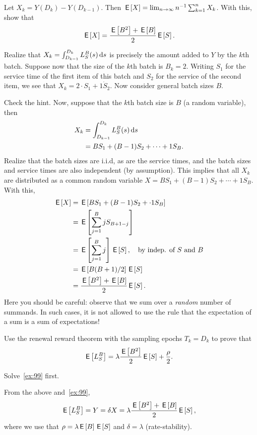 \begin{extra}\label{ex:99}
Let $X_k = Y(D_k)-Y(D_{k-1})$. Then $\,\mathsf{E}\left[X\right] = \lim_{n\to\infty} n^{-1} \sum_{k=1}^n X_k$. With this, show that
\begin{equation*}
  \,\mathsf{E}\left[X\right] = \frac{\,\mathsf{E}\left[B^2\right]+\,\mathsf{E}\left[B\right]}2 \,\mathsf{E}\left[S\right].
\end{equation*}
\begin{hint}
  Realize that $X_k = \int_{D_{k-1}}^{D_k} L_S^B(s) \,\text{d}s$ is precisely the amount added to $Y$ by the $k$th batch.
  Suppose now that the size of the $k$th batch is $B_k = 2$.
  Writing $S_1$ for the service time of the first item of this batch and $S_2$ for the service of the second item, we see that $X_k = 2\cdot S_1 + 1\dot S_2$.
  Now consider general batch sizes $B$.
\end{hint}
\begin{solution}
  Check the hint. Now, suppose that the $k$th batch size is $B$ (a random variable), then
  \begin{align*}
    X_k &= \int_{D_{k-1}}^{D_k} L_S^B(s) \,\text{d}s \\
    &= B S_1 + (B-1)S_2 + \cdots + 1 S_B.
  \end{align*}
  Realize that the batch sizes are i.i.d, as are the service times, and the batch sizes and service times are also independent (by assumption).
  This implies that all $X_k$ are distributed as a common random variable $X= B S_1 + (B-1)S_2 + \cdots + 1 S_B$.
  With this,
  \begin{align*}
    \,\mathsf{E}\left[X\right] & = \,\mathsf{E}\left[B S_1 + (B-1)S_2 + \cdot 1 S_B\right]\\
    &= \,\mathsf{E}\left[\sum_{j=1}^B j S_{B+1-j}\right] \\
    &= \,\mathsf{E}\left[\sum_{j=1}^B j\right] \,\mathsf{E}\left[S\right], \quad\text{by indep. of $S$ and $B$} \\
    &= \,\mathsf{E}\left[B(B+1)/2\right] \,\mathsf{E}\left[S\right] \\
    &= \frac{\,\mathsf{E}\left[B^2\right]+\,\mathsf{E}\left[B\right]}2 \,\mathsf{E}\left[S\right].
  \end{align*}
  Here you should be careful: observe that we sum over a \emph{random} number of summands.
  In such cases, it is not allowed to use the rule that the expectation of a sum is a sum of expectations!
\end{solution}
\end{extra}


\begin{exercise}\label{ex:100}
Use the renewal reward theorem with the sampling epochs $T_k = D_k$ to prove that
\begin{equation*}
  \,\mathsf{E}\left[L_S^B\right] = \lambda \frac{\,\mathsf{E}\left[B^2\right]}2\,\mathsf{E}\left[S\right] + \frac\rho 2.
\end{equation*}
\begin{hint}
  Solve~\cref{ex:99} first. 
\end{hint}
\begin{solution}
  From the above and~\cref{ex:99},
  \begin{equation*}
    \,\mathsf{E}\left[L_S^B\right] = Y = \delta X = \lambda \frac{\,\mathsf{E}\left[B^2\right]+\,\mathsf{E}\left[B\right]}2 \,\mathsf{E}\left[S\right],
  \end{equation*}
where we use that $\rho = \lambda \,\mathsf{E}\left[B\right] \,\mathsf{E}\left[S\right]$ and $\delta = \lambda$ (rate-stability).
\end{solution}
\end{exercise}



